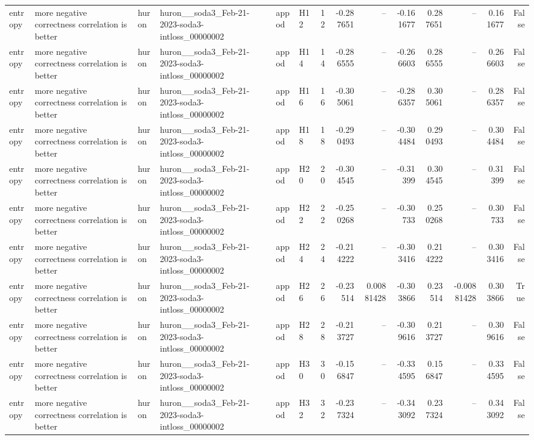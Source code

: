 \begin{longtable}{llllllrrrrrrrr}
entropy & more negative correctness correlation is better & huron & huron\_\_soda3\_Feb-21-2023-soda3-intloss\_00000002 & appod & H12 & 12 & -0.287651 & -- & -0.161677 & 0.287651 & -- & 0.161677 & False \\
entropy & more negative correctness correlation is better & huron & huron\_\_soda3\_Feb-21-2023-soda3-intloss\_00000002 & appod & H14 & 14 & -0.286555 & -- & -0.266603 & 0.286555 & -- & 0.266603 & False \\
entropy & more negative correctness correlation is better & huron & huron\_\_soda3\_Feb-21-2023-soda3-intloss\_00000002 & appod & H16 & 16 & -0.305061 & -- & -0.286357 & 0.305061 & -- & 0.286357 & False \\
entropy & more negative correctness correlation is better & huron & huron\_\_soda3\_Feb-21-2023-soda3-intloss\_00000002 & appod & H18 & 18 & -0.290493 & -- & -0.304484 & 0.290493 & -- & 0.304484 & False \\
entropy & more negative correctness correlation is better & huron & huron\_\_soda3\_Feb-21-2023-soda3-intloss\_00000002 & appod & H20 & 20 & -0.304545 & -- & -0.31399 & 0.304545 & -- & 0.31399 & False \\
entropy & more negative correctness correlation is better & huron & huron\_\_soda3\_Feb-21-2023-soda3-intloss\_00000002 & appod & H22 & 22 & -0.250268 & -- & -0.30733 & 0.250268 & -- & 0.30733 & False \\
entropy & more negative correctness correlation is better & huron & huron\_\_soda3\_Feb-21-2023-soda3-intloss\_00000002 & appod & H24 & 24 & -0.214222 & -- & -0.303416 & 0.214222 & -- & 0.303416 & False \\
entropy & more negative correctness correlation is better & huron & huron\_\_soda3\_Feb-21-2023-soda3-intloss\_00000002 & appod & H26 & 26 & -0.23514 & 0.00881428 & -0.303866 & 0.23514 & -0.00881428 & 0.303866 & True \\
entropy & more negative correctness correlation is better & huron & huron\_\_soda3\_Feb-21-2023-soda3-intloss\_00000002 & appod & H28 & 28 & -0.213727 & -- & -0.309616 & 0.213727 & -- & 0.309616 & False \\
entropy & more negative correctness correlation is better & huron & huron\_\_soda3\_Feb-21-2023-soda3-intloss\_00000002 & appod & H30 & 30 & -0.156847 & -- & -0.334595 & 0.156847 & -- & 0.334595 & False \\
entropy & more negative correctness correlation is better & huron & huron\_\_soda3\_Feb-21-2023-soda3-intloss\_00000002 & appod & H32 & 32 & -0.237324 & -- & -0.343092 & 0.237324 & -- & 0.343092 & False \\

\end{longtable}
